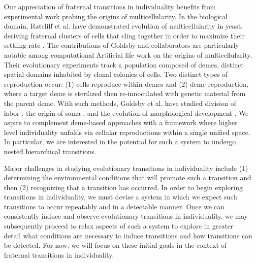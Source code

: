 Our appreciation of fraternal transitions in individuality benefits from experimental work probing the origins of multicellularity.
In the biological domain, Ratcliff et al. have demonstrated evolution of multicellularity in yeast, deriving fraternal clusters of cells that cling together in order to maximize their settling rate \citep{ratcliff2012experimental}.
The contributions of Goldsby and collaborators are particularly notable among computational Artificial life work on the origins of multicellularity.
Their evolutionary experiments track a population composed of demes, distinct spatial domains inhabited by clonal colonies of cells.
Two distinct types of reproduction occur: (1) cells reproduce within demes and (2) deme reproduction, where a target deme is sterilized then re-innoculated with genetic material from the parent deme.
With such methods, Goldsby et al. have studied division of labor \citep{goldsby2010evolution, goldsby2012task}, the origin of soma \citep{goldsby2014evolutionary}, and the evolution of morphological development \citep{goldsby2017increasing}.
We aspire to complement deme-based approaches with a framework where higher level individuality unfolds via cellular reproductions within a single unified space.
In particular, we are interested in the potential for such a system to undergo nested hierarchical transitions.

Major challenges in studying evolutionary transitions in individuality include (1) determining the environmental conditions that will promote such a transition and then (2) recognizing that a transition has occurred.
In order to begin exploring transitions in individuality, we must devise a system in which we expect such transitions to occur repeatably and in a detectable manner.
Once we can consistently induce and observe evolutionary transitions in individuality, we may subsequently proceed to relax aspects of such a system to explore in greater detail what conditions are necessary to induce transitions and how transitions can be detected.
For now, we will focus on these initial goals in the context of fraternal transitions in individuality.

